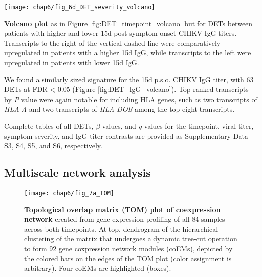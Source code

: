 \begin{marginfigure}[-3.5cm]
  \centering
  \texttt{[image: chap6/fig\_6d\_DET\_severity\_volcano]}
  \caption[Volcano plot of differentially expressed host transcripts for symptom severity]{
  \textbf{Volcano plot} as in Figure \ref{fig:DET_timepoint_volcano} but for DETs between patients with higher and lower 15d post symptom onset CHIKV IgG titers. Transcripts to the right of the vertical dashed line were comparatively upregulated in patients with a higher 15d IgG, while transcripts to the left were upregulated in patients with lower 15d IgG.
  }
  \label{fig:DET_IgG_volcano}
\end{marginfigure}

We found a similarly sized signature for the 15d p.s.o. CHIKV IgG titer, with 63 DETs at FDR < 0.05 (Figure \ref{fig:DET_IgG_volcano}). Top-ranked transcripts by \emph{P} value were again notable for including HLA genes, such as two transcripts of \emph{HLA-A} and two transcripts of \emph{HLA-DOB} among the top eight transcripts.

Complete tables of all DETs, $\beta$ values, and \emph{q} values for the timepoint, viral titer, symptom severity, and IgG titer contrasts are provided as Supplementary Data S3, S4, S5, and S6, respectively.

\subsection{Multiscale network analysis}

\begin{figure}[htb]
  \centering
  \texttt{[image: chap6/fig\_7a\_TOM]}
  \caption[Topological overlap matrix (TOM) plot of coexpression network]{
  \textbf{Topological overlap matrix (TOM) plot of coexpression network} created from gene expression profiling of all 84 samples across both timepoints. At top, dendrogram of the hierarchical clustering of the matrix that undergoes a dynamic tree-cut operation to form 92 gene coxpression network modules (coEMs), depicted by the colored bars on the edges of the TOM plot (color assignment is arbitrary). Four coEMs are highlighted (boxes).
  }
  \label{fig:chik_TOM}
\end{figure}

